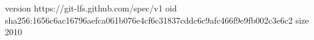 version https://git-lfs.github.com/spec/v1
oid sha256:1656c6ac16796aefca061b076e4cf6c31837cddc6c9afc466f9e9fb002c3e6c2
size 2010
